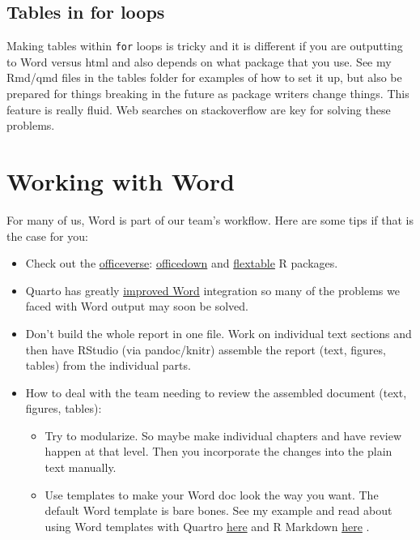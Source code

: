 \documentclass[
  letterpaper,
  oneside]{scrbook}
\providecommand{\tightlist}{%
  \setlength{\itemsep}{0pt}\setlength{\parskip}{0pt}}\usepackage{longtable,booktabs,array}
\begin{document}
\hypertarget{tables-in-for-loops}{%
\subsection{Tables in for loops}\label{tables-in-for-loops}}

Making tables within \texttt{for} loops is tricky and it is different if
you are outputting to Word versus html and also depends on what package
that you use. See my Rmd/qmd files in the tables folder for examples of
how to set it up, but also be prepared for things breaking in the future
as package writers change things. This feature is really fluid. Web
searches on stackoverflow are key for solving these problems.

\hypertarget{working-with-word}{%
\section{Working with Word}\label{working-with-word}}

For many of us, Word is part of our team's workflow. Here are some tips
if that is the case for you:

\begin{itemize}
\tightlist
\item
  Check out the
  \href{https://ardata-fr.github.io/officeverse/index.html}{officeverse}:
  \href{https://CRAN.R-project.org/package=officedown}{officedown} and
  \href{https://CRAN.R-project.org/package=flextable}{flextable} R
  packages.
\item
  Quarto has greatly
  \href{https://quarto.org/docs/output-formats/ms-word.html}{improved
  Word} integration so many of the problems we faced with Word output
  may soon be solved.
\item
  Don't build the whole report in one file. Work on individual text
  sections and then have RStudio (via pandoc/knitr) assemble the report
  (text, figures, tables) from the individual parts.
\item
  How to deal with the team needing to review the assembled document
  (text, figures, tables):

  \begin{itemize}
  \tightlist
  \item
    Try to modularize. So maybe make individual chapters and have review
    happen at that level. Then you incorporate the changes into the
    plain text manually.
  \item
    Use templates to make your Word doc look the way you want. The
    default Word template is bare bones. See my example and read about
    using Word templates with Quartro
    \href{https://quarto.org/docs/output-formats/ms-word-templates.html}{here}
    and R Markdown
    \href{https://bookdown.org/yihui/rmarkdown-cookbook/word-template.html}{here}
    .
  \end{itemize}
\end{itemize}
\end{document}
